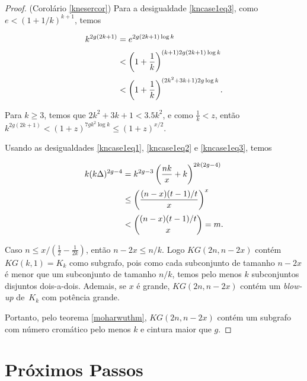 \documentclass{article}
\begin{document}
\begin{proof}{(Corolário \ref{knesercor})}
Para a desigualdade \ref{kncase1eq3}, como $e < (1+1/k)^{k+1}$, temos

\begin{equation*}
\setlength{\jot}{5pt}
\begin{aligned}
k^{2g(2k+1)} & = e^{2g(2k+1)\log k}\\
& < \left(1+\frac{1}{k}\right)^{(k+1)2g(2k+1)\log k}\\
& < \left(1+\frac{1}{k}\right)^{(2k^2+3k+1)2g\log k}.
\end{aligned}
\end{equation*}

Para $k \geq 3$, temos que $2k^2+3k+1<3.5k^2$, e como $\frac{1}{k} < z$, então $k^{2g(2k+1)} < (1+z)^{7gk^2\log k} \leq (1+z)^{x/2}$.

Usando as desigualdades \ref{kncase1eq1}, \ref{kncase1eq2} e \ref{kncase1eq3}, temos

\begin{equation*}
\setlength{\jot}{5pt}
\begin{aligned}
k(k\Delta)^{2g-4} & = k^{2g-3}\left(\frac{nk}{x}+k\right)^{2k(2g-4)} \\
 & \leq \left(\frac{(n-x)(t-1)/t}{x}\right)^x \\
 & < \binom{(n-x)(t-1)/t}{x} = m.
\end{aligned}
\end{equation*}


Caso $n \leq x/(\frac{1}{2} - \frac{1}{2k})$, então $n-2x \leq n/k$. Logo $KG(2n,n-2x)$ contém $KG(k,1) = K_k$ como subgrafo, pois como cada subconjunto de tamanho $n-2x$ é menor que um subconjunto de tamanho $n/k$, temos pelo menos $k$ subconjuntos disjuntos dois-a-dois. Ademais, se $x$ é grande, $KG(2n,n-2x)$ contém um \textit{blow-up} de~$K_k$ com potência grande.

Portanto, pelo teorema \ref{moharwuthm}, $KG(2n,n-2x)$ contém um subgrafo com número cromático pelo menos $k$ e cintura maior que $g$.
\end{proof}

\section{Próximos Passos}



\end{document}

